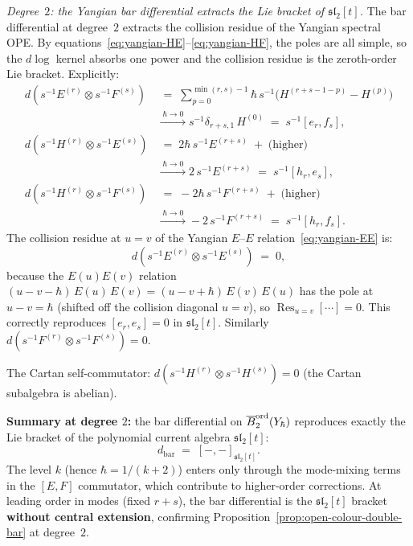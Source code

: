 \begin{computation}
\emph{Degree~$2$: the Yangian bar differential extracts
the Lie bracket of $\mathfrak{sl}_2[t]$.}\enspace
The bar differential at degree~$2$ extracts the
collision residue of the Yangian spectral OPE. By
equations~\eqref{eq:yangian-HE}--\eqref{eq:yangian-HF},
the poles are all simple, so the $d\!\log$ kernel
absorbs one power and the collision residue is the
zeroth-order Lie bracket. Explicitly:
\begin{align*}
d(s^{-1}E^{(r)}\otimes s^{-1}F^{(s)})
&\;=\;
\sum_{p=0}^{\min(r,s)-1}
\hbar\,s^{-1}\bigl(
H^{(r+s-1-p)} - H^{(p)}\bigr)
\\
&\xrightarrow{\;\hbar\to 0\;}
s^{-1}\delta_{r+s,1}\,H^{(0)}
\;=\;s^{-1}[e_r,f_s],
\\[4pt]
d(s^{-1}H^{(r)}\otimes s^{-1}E^{(s)})
&\;=\;
2\hbar\,s^{-1}E^{(r+s)}
\;+\;\text{(higher)}
\\
&\xrightarrow{\;\hbar\to 0\;}
2\,s^{-1}E^{(r+s)}
\;=\;s^{-1}[h_r,e_s],
\\[4pt]
d(s^{-1}H^{(r)}\otimes s^{-1}F^{(s)})
&\;=\;
-2\hbar\,s^{-1}F^{(r+s)}
\;+\;\text{(higher)}
\\
&\xrightarrow{\;\hbar\to 0\;}
-2\,s^{-1}F^{(r+s)}
\;=\;s^{-1}[h_r,f_s].
\end{align*}
The collision residue at $u = v$ of the Yangian
$E$--$E$ relation~\eqref{eq:yangian-EE} is:
\[
d(s^{-1}E^{(r)}\otimes s^{-1}E^{(s)})
\;=\;0,
\]
because the $E(u)E(v)$ relation
$(u{-}v{-}\hbar)\,E(u)\,E(v)
= (u{-}v{+}\hbar)\,E(v)\,E(u)$
has the pole at $u{-}v = \hbar$ (shifted off the
collision diagonal $u = v$), so
$\operatorname{Res}_{u=v}[\cdots] = 0$. This
correctly reproduces $[e_r,e_s] = 0$ in
$\mathfrak{sl}_2[t]$. Similarly
$d(s^{-1}F^{(r)}\otimes s^{-1}F^{(s)}) = 0$.

The Cartan self-commutator:
$d(s^{-1}H^{(r)}\otimes s^{-1}H^{(s)}) = 0$
(the Cartan subalgebra is abelian).

\textbf{Summary at degree $2$:} the bar differential
on $\overline{B}^{\mathrm{ord}}_2(Y_\hbar)$ reproduces exactly
the Lie bracket of the polynomial current algebra
$\mathfrak{sl}_2[t]$:
\[
d_{\mathrm{bar}}
\;=\;
[-,-]_{\mathfrak{sl}_2[t]}.
\]
The level $k$ (hence $\hbar = 1/(k{+}2)$) enters only
through the mode-mixing terms in the $[E,F]$
commutator, which contribute to higher-order
corrections. At leading order in modes (fixed
$r{+}s$), the bar differential is the
$\mathfrak{sl}_2[t]$ bracket \textbf{without central
extension}, confirming
Proposition~\ref{prop:open-colour-double-bar}
at degree~$2$.


\end{computation}
